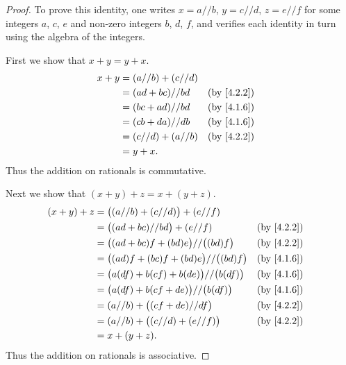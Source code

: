 \begin{proof}
  To prove this identity, one writes \(x = a // b\), \(y = c // d\), \(z = e // f\) for some integers \(a\), \(c\), \(e\) and non-zero integers \(b\), \(d\), \(f\), and verifies each identity in turn using the algebra of the integers.

  First we show that \(x + y = y + x\).
  \begin{align*}
    x + y & = (a // b) + (c // d)                               \\
          & = (ad + bc) // bd     &  & \text{(by \cref{4.2.2})} \\
          & = (bc + ad) // bd     &  & \text{(by \cref{4.1.6})} \\
          & = (cb + da) // db     &  & \text{(by \cref{4.1.6})} \\
          & = (c // d) + (a // b) &  & \text{(by \cref{4.2.2})} \\
          & = y + x.
  \end{align*}
  Thus the addition on rationals is commutative.

  Next we show that \((x + y) + z = x + (y + z)\).
  \begin{align*}
    (x + y) + z & = \big((a // b) + (c // d)\big) + (e // f)                                         \\
                & = \big((ad + bc) // bd\big) + (e // f)               &  & \text{(by \cref{4.2.2})} \\
                & = \big((ad + bc)f + (bd)e\big) // \big((bd)f\big)    &  & \text{(by \cref{4.2.2})} \\
                & = \big((ad)f + (bc)f + (bd)e\big) // \big((bd)f\big) &  & \text{(by \cref{4.1.6})} \\
                & = \big(a(df) + b(cf) + b(de)\big) // \big(b(df)\big) &  & \text{(by \cref{4.1.6})} \\
                & = \big(a(df) + b(cf + de)\big) // \big(b(df)\big)    &  & \text{(by \cref{4.1.6})} \\
                & = (a // b) + \big((cf + de) // df\big)               &  & \text{(by \cref{4.2.2})} \\
                & = (a // b) + \big((c // d) + (e // f)\big)           &  & \text{(by \cref{4.2.2})} \\
                & = x + (y + z).
  \end{align*}
  Thus the addition on rationals is associative.


\end{proof}
